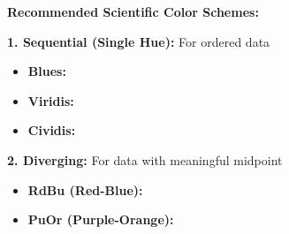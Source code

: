 \documentclass[11pt,a4paper]{article}
\begin{document}
\begin{tcolorbox}[colback=blue!5,colframe=blue!50,title=Professional Color Palettes]
\textbf{Recommended Scientific Color Schemes:}

\textbf{1. Sequential (Single Hue):} For ordered data

\begin{itemize}
    \item \textbf{Blues:} 
    \colorbox[HTML]{f7fbff}{\phantom{XX}}
    \colorbox[HTML]{deebf7}{\phantom{XX}}
    \colorbox[HTML]{c6dbef}{\phantom{XX}}
    \colorbox[HTML]{9ecae1}{\phantom{XX}}
    \colorbox[HTML]{6baed6}{\phantom{XX}}
    \colorbox[HTML]{4292c6}{\phantom{XX}}
    \colorbox[HTML]{2171b5}{\phantom{XX}}
    \colorbox[HTML]{08519c}{\phantom{XX}}
    \colorbox[HTML]{08306b}{\phantom{XX}}
    
    \item \textbf{Viridis:} 
    \colorbox[HTML]{440154}{\phantom{XX}}
    \colorbox[HTML]{482777}{\phantom{XX}}
    \colorbox[HTML]{3f4a8a}{\phantom{XX}}
    \colorbox[HTML]{31678e}{\phantom{XX}}
    \colorbox[HTML]{26838f}{\phantom{XX}}
    \colorbox[HTML]{1f9d8a}{\phantom{XX}}
    \colorbox[HTML]{6cce5a}{\phantom{XX}}
    \colorbox[HTML]{b6de2b}{\phantom{XX}}
    \colorbox[HTML]{fde725}{\phantom{XX}}
    
    \item \textbf{Cividis:} 
    \colorbox[HTML]{00204d}{\phantom{XX}}
    \colorbox[HTML]{00336f}{\phantom{XX}}
    \colorbox[HTML]{39486a}{\phantom{XX}}
    \colorbox[HTML]{575c6d}{\phantom{XX}}
    \colorbox[HTML]{707173}{\phantom{XX}}
    \colorbox[HTML]{8a8779}{\phantom{XX}}
    \colorbox[HTML]{a69d75}{\phantom{XX}}
    \colorbox[HTML]{c4b56c}{\phantom{XX}}
    \colorbox[HTML]{e4cf5b}{\phantom{XX}}
    \colorbox[HTML]{ffe945}{\phantom{XX}}
\end{itemize}

\textbf{2. Diverging:} For data with meaningful midpoint

\begin{itemize}
    \item \textbf{RdBu (Red-Blue):} 
    \colorbox[HTML]{b2182b}{\phantom{XX}}
    \colorbox[HTML]{d6604d}{\phantom{XX}}
    \colorbox[HTML]{f4a582}{\phantom{XX}}
    \colorbox[HTML]{fddbc7}{\phantom{XX}}
    \colorbox[HTML]{f7f7f7}{\phantom{XX}}
    \colorbox[HTML]{d1e5f0}{\phantom{XX}}
    \colorbox[HTML]{92c5de}{\phantom{XX}}
    \colorbox[HTML]{4393c3}{\phantom{XX}}
    \colorbox[HTML]{2166ac}{\phantom{XX}}
    
    \item \textbf{PuOr (Purple-Orange):} 
    \colorbox[HTML]{762a83}{\phantom{XX}}
    \colorbox[HTML]{9970ab}{\phantom{XX}}
    \colorbox[HTML]{c2a5cf}{\phantom{XX}}
    \colorbox[HTML]{e7d4e8}{\phantom{XX}}
    \colorbox[HTML]{f7f7f7}{\phantom{XX}}
    \colorbox[HTML]{fdb863}{\phantom{XX}}
    \colorbox[HTML]{e08214}{\phantom{XX}}
    \colorbox[HTML]{b35806}{\phantom{XX}}
    \colorbox[HTML]{7f3b08}{\phantom{XX}}
    

\end{itemize}
\end{tcolorbox}
\end{document}
